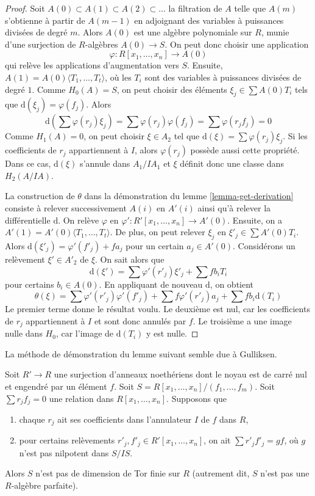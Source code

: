\begin{proof}
Soit $A(0) \subset A(1) \subset A(2) \subset \ldots$ la filtration
de $A$ telle que $A(m)$ s'obtienne à partir de $A(m - 1)$ en adjoignant
des variables à puissances divisées de degré $m$. Alors $A(0)$ est une
algèbre polynomiale sur $R$, munie d'une surjection de $R$-algèbres
$A(0) \to S$.
On peut donc choisir une application
$$
\varphi : R[x_1, \ldots, x_n] \to A(0)
$$
qui relève les applications d'augmentation vers $S$.
Ensuite, $A(1) = A(0)\langle T_1, \ldots, T_t \rangle$, où les $T_i$
sont des variables à puissances divisées de degré $1$. Comme
$H_0(A) = S$, on peut choisir des éléments
$\xi_j \in \sum A(0)T_i$ tels que $\text{d}(\xi_j) = \varphi(f_j)$.
Alors
$$
\text{d}\left(\sum \varphi(r_j) \xi_j\right) =
\sum  \varphi(r_j) \varphi(f_j) =  \sum \varphi(r_jf_j) = 0
$$
Comme $H_1(A) = 0$, on peut choisir $\xi \in A_2$ tel que
$\text{d}(\xi) = \sum \varphi(r_j) \xi_j$.
Si les coefficients de $r_j$ appartiennent à $I$, alors
$\varphi(r_j)$ possède aussi cette propriété. Dans ce cas,
$\text{d}(\xi)$ s'annule dans $A_1/IA_1$ et
$\xi$ définit donc une classe dans $H_2(A/IA)$.

\medskip\noindent
La construction de $\theta$ dans la démonstration du lemme
\ref{lemma-get-derivation}
consiste à relever successivement $A(i)$ en $A'(i)$ ainsi qu'à relever
la différentielle $\text{d}$. On relève $\varphi$
en $\varphi' : R'[x_1, \ldots, x_n] \to A'(0)$.
Ensuite, on a $A'(1) = A'(0)\langle T_1, \ldots, T_t\rangle$.
De plus, on peut relever $\xi_j$ en
$\xi'_j \in \sum A'(0)T_i$.
Alors $\text{d}(\xi'_j) = \varphi'(f'_j) + f a_j$ pour un certain
$a_j \in A'(0)$.
Considérons un relèvement $\xi' \in A'_2$ de $\xi$.
On sait alors que
$$
\text{d}(\xi') = \sum \varphi'(r'_j)\xi'_j + \sum fb_iT_i
$$
pour certains $b_i \in A(0)$. En appliquant de nouveau $\text{d}$,
on obtient
$$
\theta(\xi) = \sum \varphi'(r'_j)\varphi'(f'_j) +
\sum f \varphi'(r'_j) a_j + \sum fb_i \text{d}(T_i)
$$
Le premier terme donne le résultat voulu. Le deuxième est nul, car les
coefficients de $r_j$ appartiennent à $I$ et sont donc annulés par $f$.
Le troisième a une image nulle dans $H_0$, car l'image de
$\text{d}(T_i)$ y est nulle.
\end{proof}

\noindent
La méthode de démonstration du lemme suivant semble due à Gulliksen.

\begin{lemma}
\label{lemma-not-finite-pd}
Soit $R' \to R$ une surjection d'anneaux noethériens dont le noyau est de
carré nul et engendré par un élément $f$. Soit
$S = R[x_1, \ldots, x_n]/(f_1, \ldots, f_m)$.
Soit $\sum r_j f_j = 0$ une relation dans $R[x_1, \ldots, x_n]$.
Supposons que
\begin{enumerate}
\item chaque $r_j$ ait ses coefficients dans l'annulateur $I$ de $f$ dans $R$,
\item pour certains relèvements $r'_j, f'_j \in R'[x_1, \ldots, x_n]$, on ait
$\sum r'_j f'_j = gf$, où $g$ n'est pas nilpotent dans $S/IS$.
\end{enumerate}
Alors $S$ n'est pas de dimension de Tor finie sur $R$ (autrement dit,
$S$ n'est pas une $R$-algèbre parfaite).
\end{lemma}

